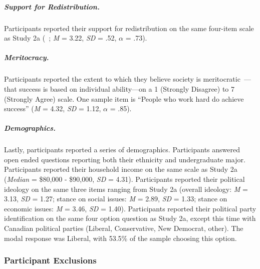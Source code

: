 \documentclass{sfuthesis}
\begin{document}
\subparagraph{Support for Redistribution.} Participants reported their support for redistribution on the same four-item scale as Study 2a (~\cite{inglehart}; \textit{M} = 3.22, \textit{SD} = .52, $\alpha$ = .73).

\subparagraph{Meritocracy.} Participants reported the extent to which they believe society is meritocratic~\cite{zimmerman13}—that success is based on individual ability—on a 1 (Strongly Disagree) to 7 (Strongly Agree) scale. One sample item is “People who work hard do achieve success” (\textit{M} = 4.32, \textit{SD} = 1.12, $\alpha$ = .85).	

\subparagraph{Demographics.} Lastly, participants reported a series of demographics. Participants answered open ended questions reporting both their ethnicity and undergraduate major. Participants reported their household income on the same scale as Study 2a (\textit{Median} = \$80,000 - \$90,000, \textit{SD} = 4.31). Participants reported their political ideology on the same three items ranging from Study 2a (overall ideology: \textit{M} = 3.13, \textit{SD} = 1.27; stance on social issues: \textit{M} = 2.89, \textit{SD} = 1.33; stance on economic issues: \textit{M} = 3.46, \textit{SD} = 1.40). Participants reported their political party identification on the same four option question as Study 2a, except this time with Canadian political parties (Liberal, Conservative, New Democrat, other). The modal response was Liberal, with 53.5\% of the sample choosing this option.

\subsubsection{Participant Exclusions}
\end{document}
